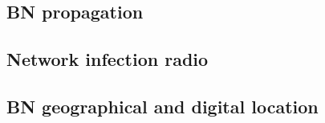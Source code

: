\label{cap:sec2}


\subsection{BN propagation}
\subsection{Network infection radio}
\subsection{BN geographical and digital location}
